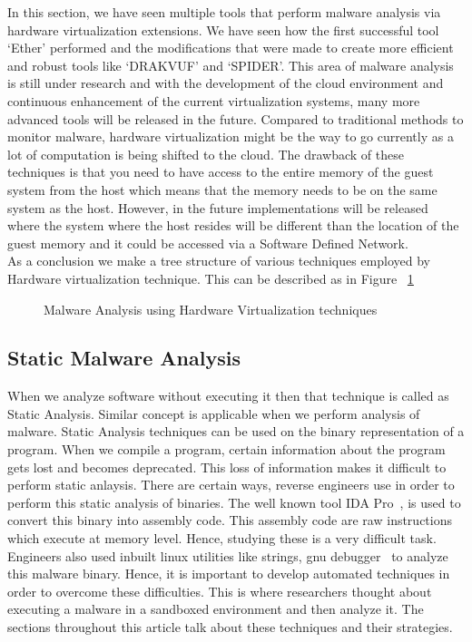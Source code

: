 \documentclass[11pt]{article}
\begin{document}
	In this section, we have seen multiple tools that perform malware analysis via hardware virtualization extensions. We have seen how the first successful tool ‘Ether’ performed and the modifications that were made to create more efficient and robust tools like ‘DRAKVUF’ and ‘SPIDER’. This area of malware analysis is still under research and with the development of the cloud environment and continuous enhancement of the current virtualization systems, many more advanced tools will be released in the future. Compared to traditional methods to monitor malware, hardware virtualization might be the way to go currently as a lot of computation is being shifted to the cloud. The drawback of these techniques is that you need to have access to the entire memory of the guest system from the host which means that the memory needs to be on the same system as the host. However, in the future implementations will be released where the system where the host resides will be different than the location of the guest memory and it could be accessed via a Software Defined Network.\\
	As a conclusion we make a tree structure of various techniques employed by Hardware virtualization technique. This can be described as in Figure ~\ref{tab:hardware-virtulization}\\
	\begin{figure}
			\centering
				\caption{Malware Analysis using Hardware Virtualization techniques}\label{tab:hardware-virtulization}
	\end{figure}


	
	\subsection{Static Malware Analysis}
	When we analyze software without executing it then that technique is called as Static Analysis. Similar concept is applicable when we perform analysis of malware. Static Analysis techniques can be used on the binary representation of a program. When we compile a program, certain information about the program gets lost and becomes deprecated. This loss of information makes it difficult to perform static anlaysis.
	There are certain ways, reverse engineers use in order to perform this static analysis of binaries. The well known tool IDA Pro~\cite{eagle2011ida}, is used to convert this binary into assembly code. This assembly code are raw instructions which execute at memory level. Hence, studying these is a very difficult task. Engineers also used inbuilt linux utilities like strings, gnu debugger~\cite{mercer2005model} to analyze this malware binary.
	Hence, it is important to develop automated techniques in order to overcome these difficulties. This is where researchers thought about executing a malware in a sandboxed environment and then analyze it. The sections throughout this article talk about these techniques and their strategies.
	
\end{document}
